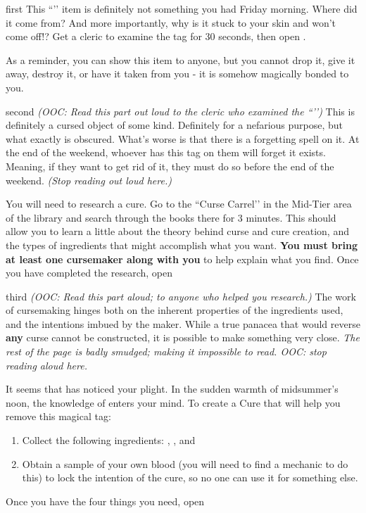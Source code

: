 \documentclass[notebook]{GL2020} %
\begin{document}
\startnotebook{\nGetItOff{}}

\begin{page}{first}
This ``\iMagicTag{}’’ item is definitely not something you had Friday morning. Where did it come from? And more importantly, why is it stuck to your skin and won’t come off!? Get a cleric to examine the tag for 30 seconds, then open .

As a reminder, you can show this item to anyone, but you cannot drop it, give it away, destroy it, or have it taken from you - it is somehow magically bonded to you.
\end{page}

\begin{page}{second}
\emph{(OOC: Read this part out loud to the cleric who examined the ``\iMagicTag{}’’)} This is definitely a cursed object of some kind. Definitely for a nefarious purpose, but what exactly is obscured. What’s worse is that there is a forgetting spell on it. At the end of the weekend, whoever has this tag on them will forget it exists. Meaning, if they want to get rid of it, they must do so before the end of the weekend. \emph{(Stop reading out loud here.)}

You will need to research a cure. Go to the ``Curse Carrel’’ in the Mid-Tier area of the library and search through the books there for 3 minutes. This should allow you to learn a little about the theory behind curse and cure creation, and the types of ingredients that might accomplish what you want. \textbf{You must bring at least one cursemaker along with you} to help explain what you find. Once you have completed the research, open 
\end{page}

\begin{page}{third}
\emph{(OOC: Read this part aloud; to anyone who helped you research.)} The work of cursemaking hinges both on the inherent properties of the ingredients used, and the intentions imbued by the maker. While a true panacea that would reverse \textbf{any} curse cannot be constructed, it is possible to make something very close. \emph{The rest of the page is badly smudged; making it impossible to read. OOC: stop reading aloud here.}

It seems that \cFarmGod{} has noticed your plight. In the sudden warmth of midsummer’s noon, the knowledge of \cFarmGod{} enters your mind. To create a Cure that will help you remove this magical tag:
\begin{enumerate}
	\item Collect the following ingredients: \iFish{}, \iCharcoal{}, and \iSight{}
	\item  Obtain a sample of your own blood (you will need to find a mechanic to do this) to lock the intention of the cure, so no one can use it for something else.
\end{enumerate}

Once you have the four things you need, open 
\end{page}
\end{document}
